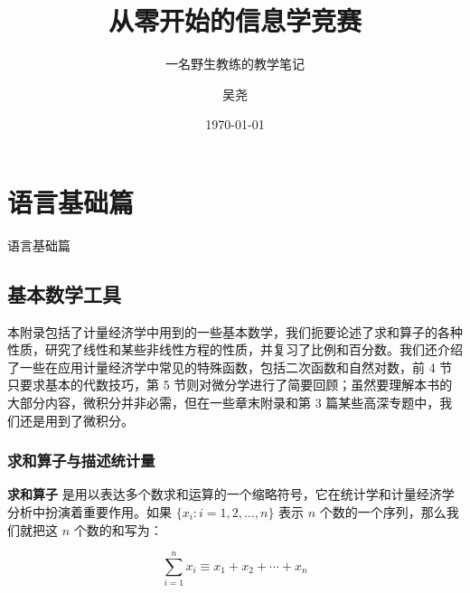 \documentclass[lang=cn,10pt]{OIBooks}
\title{从零开始的信息学竞赛}
\subtitle{一名野生教练的教学笔记}
\author{吴尧}
\date{\today}
\begin{document}
\maketitle%




\tableofcontents%

\mainmatter
\part{语言基础篇}{语言基础篇}



\printbibliography[heading=bibintoc, title=\ebibname]
\appendix

\chapter{基本数学工具}


本附录包括了计量经济学中用到的一些基本数学，我们扼要论述了求和算子的各种性质，研究了线性和某些非线性方程的性质，并复习了比例和百分数。我们还介绍了一些在应用计量经济学中常见的特殊函数，包括二次函数和自然对数，前 4 节只要求基本的代数技巧，第 5 节则对微分学进行了简要回顾；虽然要理解本书的大部分内容，微积分并非必需，但在一些章末附录和第 3 篇某些高深专题中，我们还是用到了微积分。

\section{求和算子与描述统计量}

\textbf{求和算子} 是用以表达多个数求和运算的一个缩略符号，它在统计学和计量经济学分析中扮演着重要作用。如果 $\{x_i: i=1, 2, \ldots, n\}$ 表示 $n$ 个数的一个序列，那么我们就把这 $n$ 个数的和写为：

\begin{equation}
\sum_{i=1}^n x_i \equiv x_1 + x_2 +\cdots + x_n
\end{equation}
\end{document}
